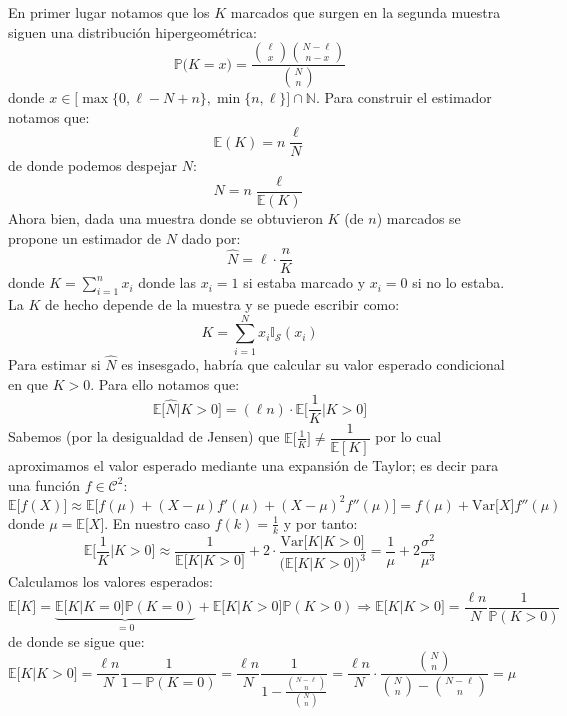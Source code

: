 \documentclass[
]{book}
\begin{document}
En primer lugar notamos que los \(K\) marcados que surgen en la segunda muestra siguen una distribución hipergeométrica:
\[
\mathbb{P}\big( K = x) = \dfrac{\binom{\ell}{x} \binom{N-\ell}{n-x}}{\binom{N}{n}}
\]
donde \(x \in \big[ \max\{ 0, \ell-N+n\}, \min\{n,\ell\}\big]\cap\mathbb{N}\). Para construir el estimador notamos que:
\[
\mathbb{E}(K) = n \frac{\ell}{N}
\]
de donde podemos despejar \(N\):
\[
N= n \frac{\ell}{\mathbb{E}(K) }
\]
Ahora bien, dada una muestra donde se obtuvieron \(K\) (de \(n\)) marcados se propone un estimador de \(N\) dado por:
\[
\hat{N} = \ell  \cdot \frac{n}{K}
\]
donde \(K = \sum_{i = 1}^n x_i\) donde las \(x_i = 1\) si estaba marcado y \(x_i = 0\) si no lo estaba. La \(K\) de hecho depende de la muestra y se puede escribir como:
\[
K = \sum_{i = 1}^N x_i\mathbb{I}_{\mathcal{S}}(x_i)
\]
Para estimar si \(\hat{N}\) es insesgado, habría que calcular su valor esperado condicional en que \(K > 0\). Para ello notamos que:
\[
\mathbb{E}\big[ \hat{N} | K > 0\big] =(\ell n) \cdot \mathbb{E}\big[ \frac{1}{K} \big| K > 0 \big]
\]
Sabemos (por la desigualdad de Jensen) que \(\mathbb{E}\big[ \frac{1}{K} \big] \neq \dfrac{1}{\mathbb{E}[K]}\) por lo cual aproximamos el valor esperado mediante una expansión de Taylor; es decir para una función \(f \in \mathcal{C}^2\):
\[
\mathbb{E}\big[ f(X) \big] \approx \mathbb{E}\big[ f(\mu) + (X - \mu) f'(\mu) +  (X - \mu)^2 f''(\mu)\big] = f(\mu) + \text{Var}\big[X\big] f''(\mu)
\]
donde \(\mu = \mathbb{E}\big[X\big]\). En nuestro caso \(f(k) = \frac{1}{k}\) y por tanto:
\[
\mathbb{E}\big[ \frac{1}{K} \big| K > 0 \big]\approx \dfrac{1}{\mathbb{E}\big[ K | K > 0]} + 2 \cdot \dfrac{\text{Var}\big[K | K > 0\big] }{\big(\mathbb{E}\big[ K | K > 0]\big)^3} = \dfrac{1}{\mu} + 2 \dfrac{\sigma^2}{\mu^3}
\]
Calculamos los valores esperados:
\[
\mathbb{E}\big[K\big] = \underbrace{\mathbb{E}\big[K | K = 0\big]\mathbb{P}(K = 0)}_{=0} + \mathbb{E}\big[K | K > 0\big]\mathbb{P}(K > 0) \Rightarrow \mathbb{E}\big[K | K > 0\big] = \frac{\ell n}{N} \dfrac{1}{\mathbb{P}(K > 0)}
\]
de donde se sigue que:
\[
\mathbb{E}\big[K | K > 0\big] = \frac{\ell n}{N} \dfrac{1}{1 - \mathbb{P}(K = 0)} = \dfrac{\ell n}{N} \dfrac{1}{1 - \frac{\binom{N-\ell}{n}}{\binom{N}{n}} } = \dfrac{\ell n}{N} \cdot \dfrac{\binom{N}{n}}{\binom{N}{n} - \binom{N-\ell}{n}} = \mu
\]
\end{document}
